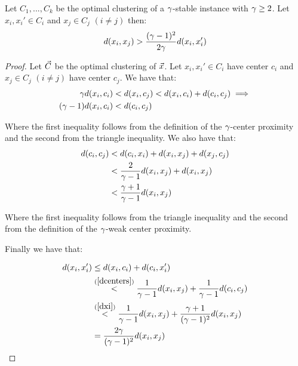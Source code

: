\begin{lemma}\label{CSprop}

Let $C_1, . . . , C_k$ be the optimal clustering of a $\gamma$-stable instance with $\gamma\ge2$. Let $x_i,x_i'\in C_i$ and $x_j \in C_j$ $(i\ne j)$ then:
\[ d(x_i,x_j) > \frac{(\gamma-1)^2}{2\gamma} d(x_i,x_i') \]
\end{lemma} 
\begin{proof}

Let $\vec{C}$ be the optimal clustering of $\vec{x}$. Let $x_i,x_i'\in C_i$ have center $c_i$ and $x_j \in C_j$ $(i\ne j)$ have center $c_j$. We have that:
\begin{align}
\gamma d(x_i,c_i)&<d(x_i,c_j)<d(x_i,c_i) + d(c_i,c_j) \implies \nonumber \\
(\gamma-1)d(x_i,c_i)&<d(c_i,c_j) \label{dcenters}
\end{align}

Where the first inequality follows from the definition of the $\gamma$-center proximity and the second from the triangle inequality.
 We also have that:
 \begin{align}
     d(c_i,c_j)&<d(c_i,x_i)+d(x_i,x_j)+d(x_j,c_j)\nonumber \\
     &<\frac{2}{\gamma-1}d(x_i,x_j)+d(x_i,x_j)\nonumber \\
     &<\frac{\gamma+1}{\gamma-1}d(x_i,x_j)\label{dxi}
 \end{align}

Where the first inequality follows from the triangle inequality and the second from the definition of the $\gamma$-weak center proximity.
 
 \bigskip
 Finally we have that:

 \begin{align*}
    d(x_i,x_i') &\le d(x_i,c_i) + d(c_i,x_i')\\
    &\stackrel{(\ref{dcenters})}{<} \frac{1}{\gamma-1}d(x_i,x_j) + \frac{1}{\gamma-1}d(c_i,c_j)\\
    &\stackrel{(\ref{dxi})}{<} \frac{1}{\gamma-1}d(x_i,x_j) + \frac{\gamma+1}{(\gamma-1)^2}d(x_i,x_j) \\
    &= \frac{2\gamma}{(\gamma-1)^2}d(x_i,x_j)
 \end{align*}
 
\end{proof}



